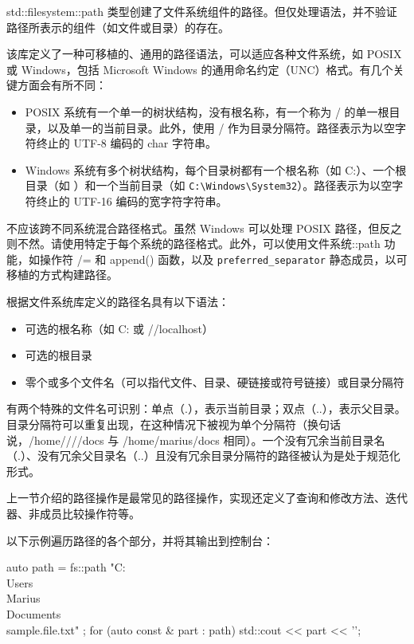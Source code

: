
std::filesystem::path 类型创建了文件系统组件的路径。但仅处理语法，并不验证路径所表示的组件（如文件或目录）的存在。

该库定义了一种可移植的、通用的路径语法，可以适应各种文件系统，如 POSIX 或 Windows，包括 Microsoft Windows 的通用命名约定（UNC）格式。有几个关键方面会有所不同：

\begin{itemize}
\item
POSIX 系统有一个单一的树状结构，没有根名称，有一个称为 / 的单一根目录，以及单一的当前目录。此外，使用 / 作为目录分隔符。路径表示为以空字符终止的 UTF-8 编码的 char 字符串。

\item
Windows 系统有多个树状结构，每个目录树都有一个根名称（如 C:）、一个根目录（如 \verb||）和一个当前目录（如 \verb|C:\Windows\System32|）。路径表示为以空字符终止的 UTF-16 编码的宽字符字符串。
\end{itemize}

\begin{myNotic}
不应该跨不同系统混合路径格式。虽然 Windows 可以处理 POSIX 路径，但反之则不然。请使用特定于每个系统的路径格式。此外，可以使用文件系统::path 功能，如操作符 /= 和 append() 函数，以及 \verb|preferred_separator| 静态成员，以可移植的方式构建路径。
\end{myNotic}

根据文件系统库定义的路径名具有以下语法：

\begin{itemize}
\item
可选的根名称（如 C: 或 //localhost）

\item
可选的根目录

\item
零个或多个文件名（可以指代文件、目录、硬链接或符号链接）或目录分隔符
\end{itemize}

有两个特殊的文件名可识别：单点（.），表示当前目录；双点（..），表示父目录。目录分隔符可以重复出现，在这种情况下被视为单个分隔符（换句话说，/home////docs 与 /home/marius/docs 相同）。一个没有冗余当前目录名（.）、没有冗余父目录名（..）且没有冗余目录分隔符的路径被认为是处于规范化形式。

上一节介绍的路径操作是最常见的路径操作，实现还定义了查询和修改方法、迭代器、非成员比较操作符等。

以下示例遍历路径的各个部分，并将其输出到控制台：

\begin{cpp}
auto path =
    fs::path{ "C:\\Users\\Marius\\Documents\\sample.file.txt" };
for (auto const & part : path)
{
    std::cout << part << '\n';
}
\end{cpp}

